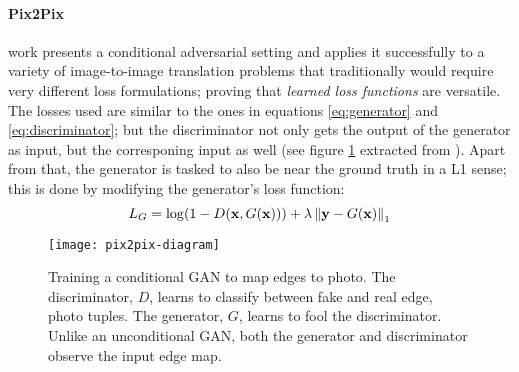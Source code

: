 \documentclass[../main.tex]{subfiles}
\begin{document}
\paragraph{Pix2Pix}
\cite{Isola2016} work presents a conditional adversarial setting and applies it
successfully to a variety of image-to-image translation problems that
traditionally would require very different loss formulations; proving that
\emph{learned loss functions} are versatile.
The losses used are similar to the ones in equations \eqref{eq:generator} and
\eqref{eq:discriminator}; but the discriminator not only gets the output of
the generator as input, but the corresponing input as well
(see figure \ref{fig:pix2pix} extracted from \cite{Isola2016}).
Apart from that, the generator is tasked to also be
near the ground truth in a L1 sense; this is done by modifying the generator's
loss function:
\begin{equation}
L_G = \log(1 - D(\mathbf{x}, G(\mathbf{x}))) +
\lambda \left\| \mathbf{y} - G(\mathbf{x}) \right\|_1
\end{equation}
\begin{figure}[H]
\centering
\texttt{[image: pix2pix-diagram]}
\caption{Training a conditional GAN to map edges to photo.
The discriminator, $D$, learns to classify between fake and real {edge, photo}
tuples. The generator, $G$, learns to fool the discriminator.
Unlike an unconditional GAN, both the generator and discriminator observe the
input edge map.}
\label{fig:pix2pix}
\end{figure}
\end{document}
